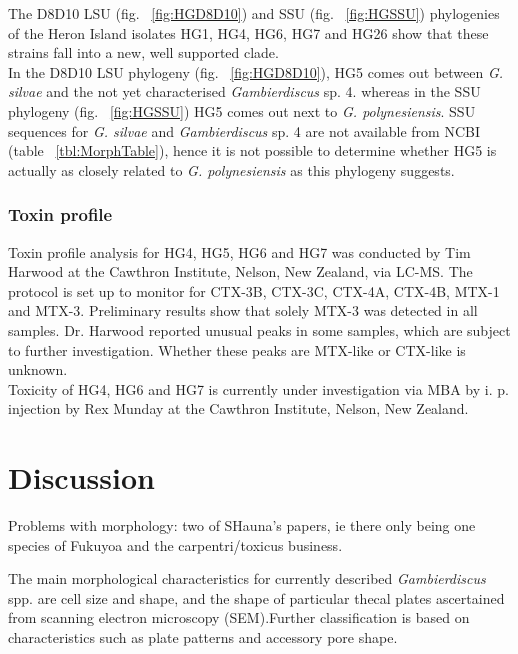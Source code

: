 \documentclass[12pt]{article}
\begin{document}
The D8D10 LSU (fig. ~\ref{fig:HGD8D10}) and SSU (fig. ~\ref{fig:HGSSU}) phylogenies of the Heron Island isolates HG1, HG4, HG6, HG7 and HG26 show that these strains fall into a new, well supported clade.\\
In the D8D10 LSU phylogeny (fig. ~\ref{fig:HGD8D10}), HG5 comes out between \emph{G. silvae} and the not yet characterised \emph{Gambierdiscus} sp. 4. whereas in the SSU phylogeny (fig. ~\ref{fig:HGSSU}) HG5 comes out next to \emph{G. polynesiensis}. SSU sequences for \emph{G. silvae} and \emph{Gambierdiscus} sp. 4 are not available from NCBI (table ~\ref{tbl:MorphTable}), hence it is not possible to determine whether HG5 is actually as closely related to \emph{G. polynesiensis} as this phylogeny suggests.\\

\subsubsection{Toxin profile}
Toxin profile analysis for HG4, HG5, HG6 and HG7 was conducted by Tim Harwood at the Cawthron Institute, Nelson, New Zealand, via LC-MS. The protocol is set up to monitor for CTX-3B, CTX-3C, CTX-4A, CTX-4B, MTX-1 and MTX-3. Preliminary results show that solely MTX-3 was detected in all samples. Dr. Harwood reported unusual peaks in some samples, which are subject to further investigation. Whether these peaks are MTX-like or CTX-like is unknown.\\
Toxicity of HG4, HG6 and HG7 is currently under investigation via MBA by i. p. injection by Rex Munday at the Cawthron Institute, Nelson, New Zealand.\\

\section{Discussion}



Problems with morphology: two of SHauna's papers, ie there only being one species of Fukuyoa and the carpentri/toxicus business.

The main morphological characteristics for currently described \emph{Gambierdiscus} spp. are cell size and shape, and the shape of particular thecal plates ascertained from scanning electron microscopy (SEM).Further classification is based on characteristics such as plate patterns and accessory pore shape. %
\end{document}
